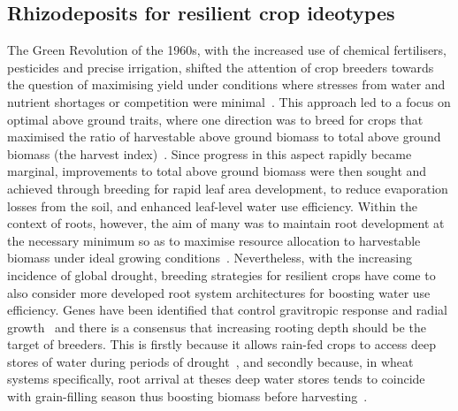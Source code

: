 \documentclass[11pt,a4paper]{article}
\numberwithin{equation}{section}
\begin{document}
\subsection{Rhizodeposits for resilient crop ideotypes}
The Green Revolution of the 1960s, with the increased use of chemical fertilisers, pesticides and precise irrigation, shifted the attention of crop breeders towards the question of maximising yield under conditions where stresses from water and nutrient shortages or competition were minimal~\citep{preece2020return}. This approach led to a focus on optimal above ground traits, where one direction was to breed for crops that maximised the ratio of harvestable above ground biomass to total above ground biomass (the harvest index)~\citep{richards1993improving}. Since progress in this aspect rapidly became marginal, improvements to total above ground biomass were then sought and achieved through breeding for rapid leaf area development, to reduce evaporation losses from the soil, and enhanced leaf-level water use efficiency. Within the context of roots, however, the aim of many was to maintain root development at the necessary minimum so as to maximise resource allocation to harvestable biomass under ideal growing conditions~\citep{condon2004breeding}. Nevertheless, with the increasing incidence of global drought, breeding strategies for resilient crops have come to also consider more developed root system architectures for boosting water use efficiency. Genes have been identified that control gravitropic response and radial growth~\citep{hafeez2024breeding} and there is a consensus that increasing rooting depth should be the target of breeders. This is firstly because it allows rain-fed crops to access deep stores of water during periods of drought~\citep{lynch2013steep, uga2013control}, and secondly because, in wheat systems specifically, root arrival at theses deep water stores tends to coincide with grain-filling season thus boosting biomass before harvesting~\citep{palta2011large, wasson2012traits, ober2021wheat}.

\end{document}
